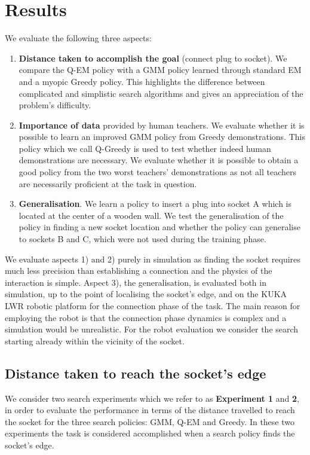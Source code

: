 \documentclass[final,5p,times,twocolumn]{elsarticle}
\begin{document}
\section{Results}\label{sec:results}

We evaluate the following three aspects:
\begin{enumerate}
 \item \textbf{Distance taken to accomplish the goal} (connect plug to socket). We compare the Q-EM policy with 
 a GMM policy learned through standard EM and a myopic Greedy policy. This highlights the difference between complicated and simplistic  
  search algorithms and gives an appreciation of the problem's difficulty.
 \item \textbf{Importance of data} provided by human teachers. We evaluate whether it is possible to learn 
 an improved GMM policy from Greedy demonstrations. This policy which we call Q-Greedy is used to test whether 
 indeed human demonstrations are necessary. We evaluate whether it is possible to obtain a good policy from the two worst teachers' demonstrations as not all teachers 
 are necessarily proficient at the task in question. 
  \item \textbf{Generalisation}. We learn a policy to insert a plug into socket A which is located at the center of a wooden 
 wall. We test the generalisation of the policy in finding a new socket location and whether the policy can generalise to sockets 
 B and C, which were not used during the training phase.
\end{enumerate}

We evaluate aspects 1) and 2) purely in simulation as finding the socket requires much less precision than establishing a 
connection and the physics of the interaction is simple. Aspect 3), the generalisation, is evaluated both in simulation,
up to the point of localising the socket's edge, and on the KUKA LWR robotic platform
for the connection phase of the task. The main reason for employing the robot is that the connection phase dynamics is 
complex and a simulation would be unrealistic. For the robot evaluation we consider 
the search starting already within the vicinity of the socket.

\subsection{Distance taken to reach the socket's edge}

We consider two search experiments which we refer to as \textbf{Experiment 1} and \textbf{2}, in order to evaluate the performance 
in terms of the distance travelled to reach the socket for the three search policies: GMM, Q-EM and Greedy. In these two 
experiments the task is considered accomplished when a search policy finds the socket's edge. 
\end{document}
